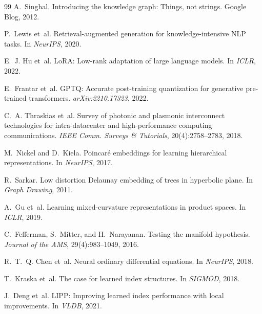 ﻿\documentclass[12pt,a4paper]{article}
\begin{document}
\begin{thebibliography}{99}
A.~Singhal.
\newblock Introducing the knowledge graph: Things, not strings.
\newblock Google Blog, 2012.

P.~Lewis et~al.
\newblock Retrieval-augmented generation for knowledge-intensive NLP tasks.
\newblock In \textit{NeurIPS}, 2020.

E.~J. Hu et~al.
\newblock LoRA: Low-rank adaptation of large language models.
\newblock In \textit{ICLR}, 2022.

E.~Frantar et~al.
\newblock GPTQ: Accurate post-training quantization for generative pre-trained
  transformers.
\newblock \textit{arXiv:2210.17323}, 2022.

C.~A. Thraskias et~al.
\newblock Survey of photonic and plasmonic interconnect technologies for
  intra-datacenter and high-performance computing communications.
\newblock \textit{IEEE Comm. Surveys \& Tutorials}, 20(4):2758--2783, 2018.

M.~Nickel and D.~Kiela.
\newblock Poincaré embeddings for learning hierarchical representations.
\newblock In \textit{NeurIPS}, 2017.

R.~Sarkar.
\newblock Low distortion Delaunay embedding of trees in hyperbolic plane.
\newblock In \textit{Graph Drawing}, 2011.

A.~Gu et~al.
\newblock Learning mixed-curvature representations in product spaces.
\newblock In \textit{ICLR}, 2019.

C.~Fefferman, S.~Mitter, and H.~Narayanan.
\newblock Testing the manifold hypothesis.
\newblock \textit{Journal of the AMS}, 29(4):983--1049, 2016.

R.~T.~Q. Chen et~al.
\newblock Neural ordinary differential equations.
\newblock In \textit{NeurIPS}, 2018.

T.~Kraska et~al.
\newblock The case for learned index structures.
\newblock In \textit{SIGMOD}, 2018.

J.~Deng et~al.
\newblock LIPP: Improving learned index performance with local improvements.
\newblock In \textit{VLDB}, 2021.


\end{thebibliography}
\end{document}
